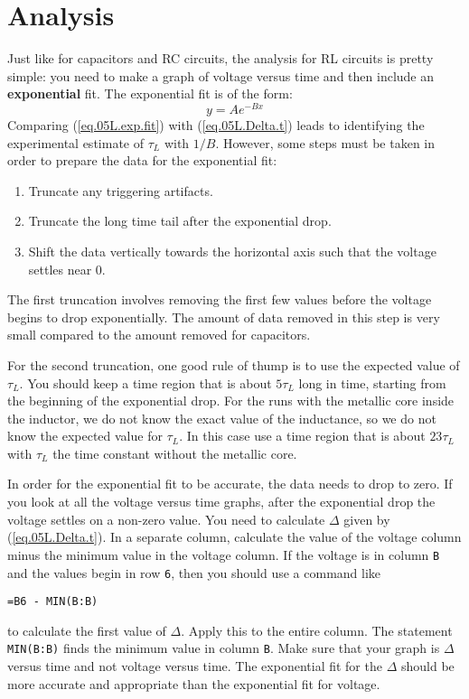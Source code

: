 \section{Analysis}
Just like for capacitors and RC circuits, the analysis for RL circuits is pretty simple: you need to make a graph of voltage versus time and then include an \textbf{exponential} fit. The exponential fit is of the form:
\begin{equation}
	y = A e^{-Bx}
	\label{eq.05L.exp.fit}
\end{equation}
Comparing (\ref{eq.05L.exp.fit}) with (\ref{eq.05L.Delta.t}) leads to identifying the experimental estimate of $\tau_{L}$ with $1 / B$.
\newpage
However, some steps must be taken in order to prepare the data for the exponential fit:
\begin{enumerate}
	\item Truncate any triggering artifacts.
	\item Truncate the long time tail after the exponential drop.
	\item Shift the data vertically towards the horizontal axis such that the voltage settles near 0.
\end{enumerate}
The first truncation involves removing the first few values before the voltage begins to drop exponentially. The amount of data removed in this step is very small compared to the amount removed for capacitors.

For the second truncation, one good rule of thump is to use the expected value of $\tau_{L}$. You should keep a time region that is about $5\tau_{L}$ long in time, starting from the beginning of the exponential drop. For the runs with the metallic core inside the inductor, we do not know the exact value of the inductance, so we do not know the expected value for $\tau_{L}$. In this case use a time region that is about $23\tau_{L}$ with $\tau_{L}$ the time constant without the metallic core.

In order for the exponential fit to be accurate, the data needs to drop to zero. If you look at all the voltage versus time graphs, after the exponential drop the voltage settles on a non-zero value. You need to calculate $\Delta$ given by (\ref{eq.05L.Delta.t}). In a separate column, calculate the value of the voltage column minus the minimum value in the voltage column. If the voltage is in column \texttt{B} and the values begin in row \texttt{6}, then you should use a command like
\begin{center}
	\texttt{=B6 - MIN(B:B)}
\end{center}
to calculate the first value of $\Delta$. Apply this to the entire column. The statement \texttt{MIN(B:B)} finds the minimum value in column \texttt{B}. Make sure that your graph is $\Delta$ versus time and not voltage versus time. The exponential fit for the $\Delta$ should be more accurate and appropriate than the exponential fit for voltage.
